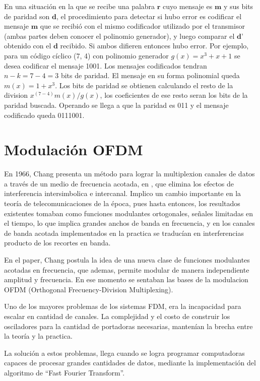 En una situación en la que se recibe una palabra $\textbf{r}$ cuyo mensaje es $\textbf{m}$  y sus bits de paridad son $\textbf{d}$, el procedimiento para detectar si hubo error es codificar el mensaje $\textbf{m}$ que se recibió con el mismo codificador utilizado por el transmisor (ambas partes deben conocer el polinomio generador), y luego comparar el $\textbf{d'}$ obtenido con el $\textbf{d}$ recibido. Si ambos difieren entonces hubo error. 
Por ejemplo, para un código cíclico (7, 4) con polinomio generador $g(x) = x^3 + x + 1$ se desea codificar el mensaje 1001. Los mensajes codificados tendran $n-k = 7 - 4 = 3$ bits de paridad. El mensaje en su forma polinomial queda $m(x) = 1 + x^3$.
Los bits de paridad se obtienen calculando el resto de la division $x^{(7-4)}m(x)/g(x)$, los coeficientes de ese resto seran los bits de la paridad buscada. Operando se llega a que la paridad es 011 y el mensaje codificado queda 0111001.

\section{Modulación OFDM}

En 1966, Chang presenta un método para lograr la multiplexion canales de datos a través de un medio de frecuencia acotada, en \cite{chang-ofdm}, que elimina los efectos de interferencia intersimbolica e intercanal. Implico un cambio importante en la teoría de telecomunicaciones de la época, pues hasta entonces, los resultados existentes tomaban como funciones modulantes ortogonales, señales limitadas en el tiempo, lo que implica grandes anchos de banda en frecuencia, y en los canales de banda acotada implementados en la practica se traducían en interferencias producto de los recortes en banda. 

En el paper, Chang postula la idea de una nueva clase de funciones modulantes acotadas en frecuencia, que ademas, permite modular de manera independiente amplitud y frecuencia. En ese momento se sentaban las bases de la modulacion OFDM (Orthogonal Frecuency-Division Multiplexing).

Uno de los mayores problemas de los sistemas FDM, era la incapacidad para escalar en cantidad de canales. La complejidad y el costo de construir los osciladores para la cantidad de portadoras necesarias, mantenían la brecha entre la teoría y la practica. 

La solución a estos problemas, llega cuando se logra programar computadoras capaces de procesar grandes cantidades de datos, mediante la implementación del algoritmo de “Fast Fourier Transform”. 

